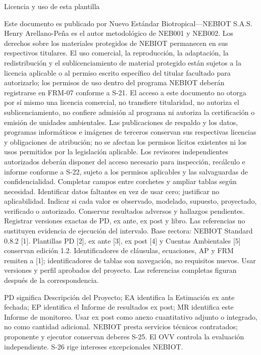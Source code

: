 \clearpage
{\fontsize{23}{27}\selectfont\color{NEBGreen}Licencia y uso de esta plantilla\par}
\vspace{4mm}
Este documento es publicado por Nuevo Estándar Biotropical—NEBIOT S.A.S. Henry Arellano-Peña es el autor metodológico de NEB001 y NEB002. Los derechos sobre los materiales protegidos de NEBIOT permanecen en sus respectivos titulares. El uso comercial, la reproducción, la adaptación, la redistribución y el sublicenciamiento de material protegido están sujetos a la licencia aplicable o al permiso escrito específico del titular facultado para autorizarlo; los permisos de uso dentro del programa NEBIOT deberán registrarse en FRM-07 conforme a S-21. El acceso a este documento no otorga por sí mismo una licencia comercial, no transfiere titularidad, no autoriza el sublicenciamiento, no confiere admisión al programa ni autoriza la certificación o emisión de unidades ambientales. Las publicaciones de respaldo y los datos, programas informáticos e imágenes de terceros conservan sus respectivas licencias y obligaciones de atribución; no se afectan los permisos lícitos existentes ni los usos permitidos por la legislación aplicable. Los revisores independientes autorizados deberán disponer del acceso necesario para inspección, recálculo e informe conforme a S-22, sujeto a los permisos aplicables y las salvaguardas de confidencialidad.
Completar campos entre corchetes y ampliar tablas según necesidad. Identificar datos faltantes en vez de usar cero; justificar no aplicabilidad. Indicar si cada valor es observado, modelado, supuesto, proyectado, verificado o autorizado. Conservar resultados adversos y hallazgos pendientes. Registrar versiones exactas de PD, ex ante, ex post y libro. Las referencias no sustituyen evidencia de ejecución del intervalo.
Base rectora: NEBIOT Standard 0.8.2 [1]. Plantillas PD [2], ex ante [3], ex post [4] y Cuentas Ambientales [5] conservan edición 1.2. Identificadores de cláusulas, ecuaciones, AP y FRM remiten a [1]; identificadores de tablas son navegación, no requisitos nuevos. Usar versiones y perfil aprobados del proyecto. Las referencias completas figuran después de la correspondencia.\par
PD significa Descripción del Proyecto; EA identifica la Estimación ex ante fechada; EP identifica el Informe de resultados ex post; MR identifica este Informe de monitoreo. Usar ex post como anexo cuantitativo adjunto o integrado, no como cantidad adicional. NEBIOT presta servicios técnicos contratados; proponente y ejecutor conservan deberes S-25. El OVV controla la evaluación independiente. S-26 rige intereses excepcionales NEBIOT.
